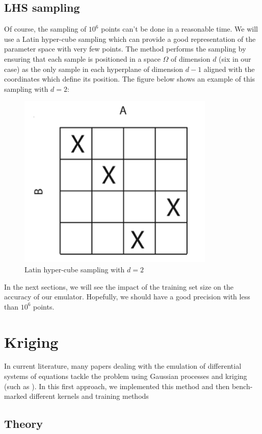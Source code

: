\documentclass{article}
\begin{document}
\subsection{LHS sampling}
 Of course, the sampling of $10^6$ points can't be done in a reasonable time. We will use a Latin hyper-cube sampling which can provide a good representation of the parameter space with very few points. The method performs the sampling by ensuring that each sample is positioned in a space $\Omega$ of dimension $d$ (six in our case)  as the only sample in each hyperplane of dimension $d-1$ aligned with the coordinates which define its position.
The figure below shows an example of this sampling with $d =2$:

\begin{figure}[H]
\centering
\includegraphics[scale=0.6]{image/lhs_d_2.png}
\caption{Latin hyper-cube sampling with $d =2$}
\label{fig: latin hypercube sampling example}
\end{figure}

In the next sections, we will see the impact of the training set size on the accuracy of our emulator. Hopefully, we should have a good precision with less than $10^6$ points.

\section{Kriging}
In current literature, many papers dealing with the emulation of differential systems of equations tackle the problem using Gaussian processes and kriging (such as \cite{ml_using_gaussian_process}). In this first approach, we implemented this method and then bench-marked different kernels and training methods 

\subsection{Theory}
\end{document}
